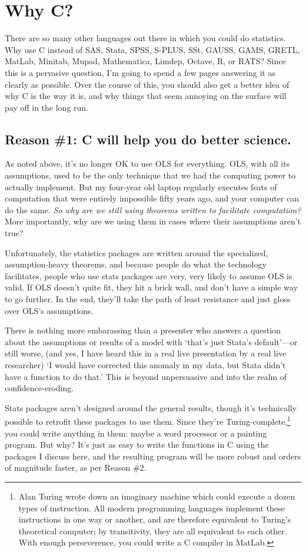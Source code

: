 \section{Why C?}

There are so many other languages out there in which you could do
statistics. Why use C instead of SAS, Stata, SPSS, S-PLUS, SSt, GAUSS, GAMS, GRETL,
MatLab, Minitab, Mupad, Mathematica, Limdep, Octave, R, or RATS? Since this is a
pervasive question, I'm going to spend a few pages answering it as clearly
as possible. Over the course of this, you should also get a better idea
of why C is the way it is, and why things that seem annoying on
the surface will pay off in the long run.

	\ifbook
\subsection{Reason \#1: C will help you do better science.}
As noted above, it's no longer OK to use OLS for everything.
OLS, with all its assumptions, used to be the only technique that we had the computing
power to actually implement. But my four-year old laptop regularly executes
feats of computation that were entirely impossible fifty years ago, and your
computer can do the same.  {\it So why are
we still using theorems written to facilitate computation?} More importantly, why
are we using them in cases where their assumptions aren't true?

Unfortunately, the statistics packages are written around the
specialized, assumption-heavy theorems, and because people do what the
technology facilitates, people who use stats packages are very, very
likely to assume OLS is valid.  If OLS doesn't quite fit, they hit a
brick wall, and don't have a simple way to go further. In the end, they'll
take the path of least resistance and just gloss over OLS's assumptions.

There is nothing more embarassing than a presenter who answers a question
about the assumptions or results of a model with `that's just Stata's
default'---or still worse, (and yes, I have heard this in a real live
presentation by a real live researcher) `I would have corrected this
anomaly in my data, but Stata didn't have a function to do that.' This
is beyond unpersuasive and into the realm of confidence-eroding.

Stats packages aren't designed around the general results, though
it's technically possible to retrofit these packages to use them. Since
they're Turing-complete,\footnote{Alan Turing wrote down an imaginary
machine which could execute a dozen types of instruction.  All
modern programming languages implement these instructions in one way or
another, and are therefore equivalent to Turing's theoretical computer;
by transitivity, they are all equivalent to each other. With enough
perseverence, you could
write a C compiler in MatLab.} you could
write anything in them: maybe a word processor or a painting program. But
why? It's just as easy to write the functions in C using the packages I discuss
here, and the resulting program will be more robust and orders of
magnitude faster, as per Reason \#2.
	\fi

